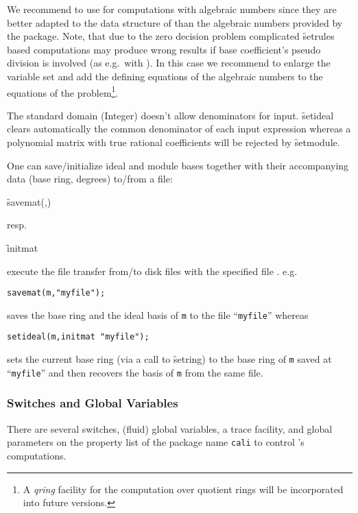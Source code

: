 We recommend to use  for computations with algebraic
numbers since they are better adapted to the data structure of 
than the algebraic numbers provided by the  package.
Note, that due to the zero decision problem
complicated \f{setrules} based computations may produce wrong
results if base coefficient's pseudo division is involved (as e.g.\
with ). In this case we recommend to enlarge
the variable set and add the defining equations of the algebraic
numbers to the equations of the problem\footnote{A \emph{qring}
facility for the computation over quotient rings will be incorporated
into future versions.}.
\medskip

The standard domain (Integer) doesn't allow denominators for input.
\f{setideal}\ttindextype[CALI]{setideal}{operator} clears automatically the common denominator of each
input expression whereas a polynomial matrix with true rational
coefficients will be rejected by \f{setmodule}.
\medskip

One can save/initialize ideal and module bases together with their
accompanying data (base ring, degrees) to/from a file:
\begin{syntax}
\f{savemat}(,)
\end{syntax}
resp.
\begin{syntax}
\f{initmat} 
\end{syntax} execute the file transfer from/to disk files with the
specified file \meta{name}. e.g.\
\begin{verbatim}
savemat(m,"myfile");
\end{verbatim}
saves the base ring and the ideal basis of \texttt{m} to the file ``\texttt{myfile}''
whereas
\begin{verbatim}
setideal(m,initmat "myfile");
\end{verbatim}
sets the current base ring (via a call to \f{setring}) to the base
ring of \texttt{m} saved at ``\texttt{myfile}'' and then recovers the basis of \texttt{m}
from the same file.

\subsubsection{Switches and Global Variables}

There are several switches, (fluid) global variables, a trace
facility, and global parameters on the property list of the package
name \texttt{cali} to control \package{CALI}'s computations.
\medskip

